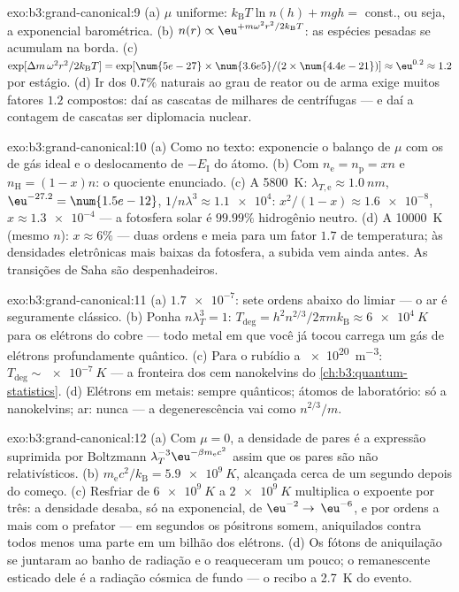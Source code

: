 \begin{solution}{exo:b3:grand-canonical:9}
(a) $\mu$ uniforme: $k_{\text{B}}T\ln n(h) + mgh = $ const., ou seja,
a exponencial barométrica. (b) $n(r) \propto
\eu^{+m\omega^2r^2/2k_{\text{B}}T}$: as espécies pesadas se acumulam na
borda. (c) $\exp[\Delta m\,\omega^2r^2/2k_{\text{B}}T] =
\exp[\num{5e-27} \times \num{3.6e5}/(2 \times \num{4.4e-21})]
\approx \eu^{0.2} \approx 1.2$ por estágio. (d) Ir dos $0.7\%$
naturais ao grau de reator ou de arma exige muitos fatores
$1.2$ compostos: daí as cascatas de milhares de
centrífugas --- e daí a contagem de cascatas ser diplomacia nuclear.
\end{solution}

\begin{solution}{exo:b3:grand-canonical:10}
(a) Como no texto: exponencie o balanço de $\mu$ com os  de gás ideal e o deslocamento de $-E_{\text{I}}$ do átomo. (b)
Com $n_{\text{e}} = n_{\text{p}} = xn$ e $n_{\text{H}} =
(1-x)n$: o quociente enunciado. (c) A \qty{5800}{K}:
$\lambda_{T,\text{e}} \approx \qty{1.0}{nm}$,
$\eu^{-27.2} = \num{1.5e-12}$, $1/n\lambda^3 \approx \num{1.1e4}$:
$x^2/(1-x) \approx \num{1.6e-8}$, $x \approx \num{1.3e-4}$ ---
a fotosfera solar é $99.99\%$ hidrogênio neutro. (d) A
\qty{10000}{K} (mesmo $n$): $x \approx 6\%$ --- duas ordens e meia
para um fator $1.7$ de temperatura; às densidades eletrônicas mais
baixas da fotosfera, a subida vem ainda antes. As transições de Saha
são despenhadeiros.
\end{solution}

\begin{solution}{exo:b3:grand-canonical:11}
(a) $\num{1.7e-7}$: sete ordens abaixo do limiar --- o ar é
seguramente clássico. (b) Ponha $n\lambda_T^3 = 1$: $T_{\text{deg}} =
h^2n^{2/3}/2\pi mk_{\text{B}} \approx \qty{6e4}{K}$ para os elétrons do
cobre --- todo metal em que você já tocou carrega um gás de elétrons
profundamente quântico. (c) Para o rubídio a \qty{e20}{m^{-3}}:
$T_{\text{deg}} \sim \qty{e-7}{K}$ --- a fronteira dos cem
nanokelvins do \cref{ch:b3:quantum-statistics}. (d) Elétrons em
metais: sempre quânticos; átomos de laboratório: só a nanokelvins;
ar: nunca --- a degenerescência vai como $n^{2/3}/m$.
\end{solution}

\begin{solution}{exo:b3:grand-canonical:12}
(a) Com $\mu = 0$, a densidade de pares é a expressão suprimida por
Boltzmann $\lambda_T^{-3}\eu^{-\beta m_{\text{e}}c^2}$ assim que os
pares são não relativísticos. (b) $m_{\text{e}}c^2/k_{\text{B}} =
\qty{5.9e9}{K}$, alcançada cerca de um segundo depois do começo.
(c) Resfriar de $\qty{6e9}{K}$ a $\qty{2e9}{K}$ multiplica o
expoente por três: a densidade desaba, só na exponencial, de $\eu^{-2} \to$
$\eu^{-6}$, e por ordens a mais com o
prefator --- em segundos os pósitrons somem, aniquilados
contra todos menos uma parte em um bilhão dos elétrons. (d) Os
fótons de aniquilação se juntaram ao banho de radiação e o reaqueceram
um pouco; o remanescente esticado dele é a radiação cósmica de fundo
--- o recibo a \qty{2.7}{K} do evento.
\end{solution}

